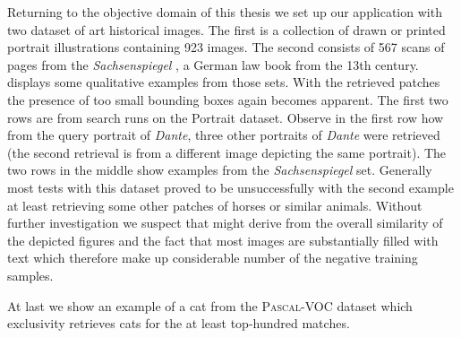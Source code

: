 Returning to the objective domain of this thesis we set up our application with two dataset of art historical images. The first is a collection of drawn or printed portrait illustrations containing 923 images. The second consists of 567 scans of pages from the \textit{Sachsenspiegel}     \citep{von_repgow_heidelberger_????}, a German law book from the 13th century.\\
 displays some qualitative examples from those sets. With the retrieved patches the presence of too small bounding boxes  again becomes apparent. The first two rows are from search runs on the Portrait dataset. Observe in the first row how from the query portrait of \textit{Dante}, three other portraits of \textit{Dante} were retrieved (the second retrieval is from a different image depicting the same portrait). The two rows in the middle show examples from the \textit{Sachsenspiegel} set. Generally most tests with this dataset proved to be unsuccessfully with the second example at least retrieving some other patches of horses or similar animals. Without further investigation we suspect that might derive from the overall similarity of the depicted figures and the fact that most images are substantially filled with text which therefore  make up considerable number of the negative training samples.

At last we show an example of a cat from the \textsc{Pascal}-VOC dataset which exclusivity retrieves cats for the at least top-hundred matches.
